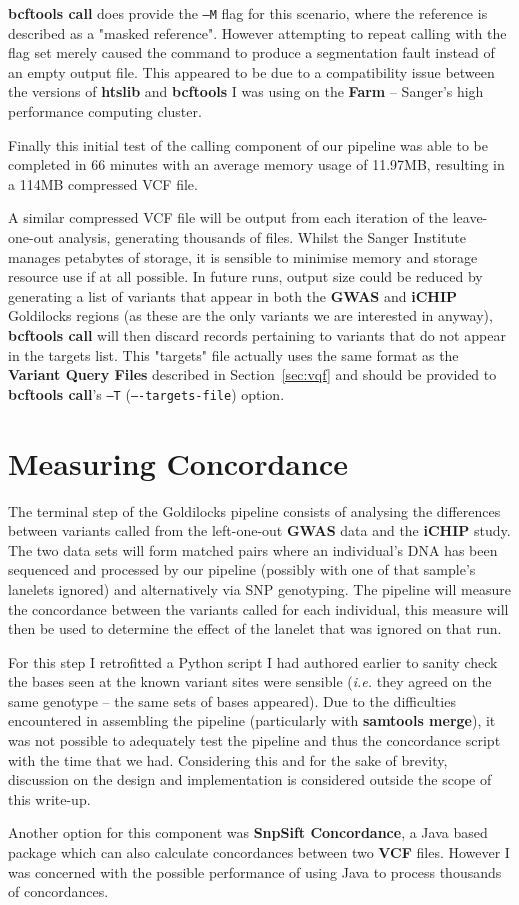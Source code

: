 \textbf{bcftools call} does provide the \texttt{--M} flag for this scenario,
where the reference is described as a "masked reference". However attempting to
repeat calling with the flag set merely caused the command to produce a
segmentation fault instead of an empty output file. This appeared to be due to a
compatibility issue between the versions of \textbf{htslib} and
\textbf{bcftools} I was using on the \textbf{Farm} -- Sanger's high performance
computing cluster.

Finally this initial test of the calling component of our pipeline was able to
be completed in 66 minutes with an average memory usage of 11.97MB, resulting in
a 114MB compressed VCF file.

A similar compressed VCF file will be output from each iteration of the
leave-one-out analysis, generating thousands of files.  Whilst the Sanger
Institute manages petabytes of storage, it is sensible to minimise memory and
storage resource use if at all possible.  In future runs, output size could be
reduced by generating a list of variants that appear in both the \textbf{GWAS}
and \textbf{iCHIP} Goldilocks regions (as these are the only variants we are
interested in anyway), \textbf{bcftools call} will then discard records
pertaining to variants that do not appear in the targets list. This "targets"
file actually uses the same format as the \textbf{Variant Query Files} described
in Section~\ref{sec:vqf} and should be provided to \textbf{bcftools call}'s
\texttt{--T} (\texttt{----targets-file}) option.


\section{Measuring Concordance}

The terminal step of the Goldilocks pipeline consists of analysing the
differences between variants called from the left-one-out \textbf{GWAS} data and
the \textbf{iCHIP} study. The two data sets will form matched pairs where an
individual's DNA has been sequenced and processed by our pipeline (possibly with
one of that sample's lanelets ignored) and alternatively via SNP genotyping.
The pipeline will measure the concordance between the variants called for each
individual, this measure will then be used to determine the effect of the
lanelet that was ignored on that run.

For this step I retrofitted a Python script I had authored earlier to sanity
check the bases seen at the known variant sites were sensible (\textit{i.e.}
they agreed on the same genotype -- the same sets of bases appeared).  Due to
the difficulties encountered in assembling the pipeline (particularly with
\textbf{samtools merge}), it was not possible to adequately test the pipeline
and thus the concordance script with the time that we had. Considering this and
for the sake of brevity, discussion on the design and implementation is
considered outside the scope of this write-up.

Another option for this component was \textbf{SnpSift
Concordance}\citep{snpeff-concordance}, a Java based package which can also
calculate concordances between two \textbf{VCF} files. However I was concerned
with the possible performance of using Java to process thousands of
concordances.

